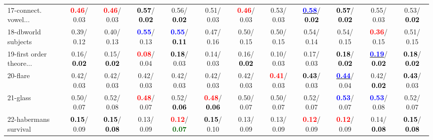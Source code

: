 \begin{table}[h]
\begin{center}
{\begin{tabular}{lc|c|c|c|c|c|c|c|c|c|c}
17-connect. vowel... & \textcolor{red}{\textbf{  0.46}}/  0.03 & \textcolor{red}{\textbf{  0.46}}/  0.03 & \textcolor{black}{\textbf{  0.57}}/\textcolor{black}{\textbf{  0.02}} &   0.56/\textcolor{black}{\textbf{  0.02}} &   0.51/  0.03 & \textcolor{red}{\textbf{  0.46}}/  0.03 &   0.53/  0.03 & \underline{\textcolor{blue}{\textbf{  0.58}}}/\textcolor{black}{\textbf{  0.02}} & \textcolor{black}{\textbf{  0.57}}/\textcolor{black}{\textbf{  0.02}} &   0.55/  0.03 &   0.53/\textcolor{black}{\textbf{  0.02}} \\
18-dbworld subjects &   0.39/  0.12 &   0.40/  0.13 & \textcolor{blue}{\textbf{  0.55}}/  0.13 & \textcolor{blue}{\textbf{  0.55}}/\textcolor{black}{\textbf{  0.11}} &   0.47/  0.16 &   0.50/  0.15 &   0.50/  0.15 &   0.54/  0.14 &   0.54/  0.15 & \textcolor{red}{\textbf{  0.36}}/  0.15 &   0.51/  0.15 \\
19-first order theore... &   0.16/\textcolor{black}{\textbf{  0.02}} &   0.15/\textcolor{black}{\textbf{  0.02}} & \textcolor{red}{\textbf{  0.08}}/  0.04 & \textcolor{black}{\textbf{  0.18}}/  0.03 &   0.14/  0.03 &   0.16/\textcolor{black}{\textbf{  0.02}} &   0.10/  0.03 &   0.17/  0.03 & \textcolor{black}{\textbf{  0.18}}/\textcolor{black}{\textbf{  0.02}} & \underline{\textcolor{blue}{\textbf{  0.19}}}/\textcolor{black}{\textbf{  0.02}} & \textcolor{black}{\textbf{  0.18}}/\textcolor{black}{\textbf{  0.02}} \\
20-flare &   0.42/  0.03 &   0.42/  0.03 &   0.42/  0.03 &   0.42/  0.03 &   0.42/  0.03 &   0.42/  0.03 & \textcolor{red}{\textbf{  0.41}}/  0.03 & \textcolor{black}{\textbf{  0.43}}/  0.03 & \underline{\textcolor{blue}{\textbf{  0.44}}}/  0.04 &   0.42/\textcolor{black}{\textbf{  0.02}} & \textcolor{black}{\textbf{  0.43}}/  0.03 \\
21-glass &   0.50/  0.07 &   0.52/  0.08 & \textcolor{red}{\textbf{  0.48}}/  0.07 &   0.52/\textcolor{black}{\textbf{  0.06}} & \textcolor{red}{\textbf{  0.48}}/\textcolor{black}{\textbf{  0.06}} &   0.50/  0.07 &   0.50/  0.07 &   0.52/  0.07 & \textcolor{blue}{\textbf{  0.53}}/  0.07 & \textcolor{blue}{\textbf{  0.53}}/  0.08 &   0.52/  0.07 \\ \hline
22-habermans survival & \textcolor{black}{\textbf{  0.15}}/  0.09 & \textcolor{black}{\textbf{  0.15}}/\textcolor{black}{\textbf{  0.08}} &   0.13/  0.09 & \textcolor{red}{\textbf{  0.12}}/\textcolor{darkgreen}{\textbf{  0.07}} & \textcolor{black}{\textbf{  0.15}}/  0.10 &   0.13/  0.09 &   0.13/  0.09 & \textcolor{red}{\textbf{  0.12}}/  0.09 & \textcolor{red}{\textbf{  0.12}}/  0.09 &   0.14/\textcolor{black}{\textbf{  0.08}} & \textcolor{black}{\textbf{  0.15}}/\textcolor{black}{\textbf{  0.08}} \\

\end{tabular}}
\end{center}
\end{table}
